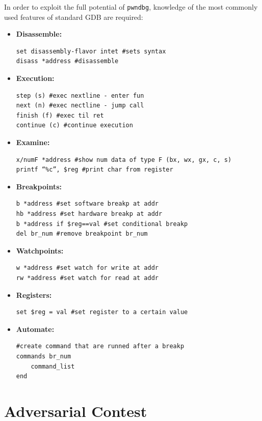 \documentclass{article}
\begin{document}
\pagebreak
In order to exploit the full potential of \texttt{pwndbg}, knowledge of the most commonly used features of standard
GDB are required:
\begin{itemize}
\item{\textbf{Disassemble:}}
\begin{verbatim}
set disassembly-flavor intet #sets syntax
disass *address #disassemble
\end{verbatim}
\item{\textbf{Execution:}}
\begin{verbatim}
step (s) #exec nextline - enter fun
next (n) #exec nectline - jump call
finish (f) #exec til ret
continue (c) #continue execution
\end{verbatim}
\item{\textbf{Examine:}}
\begin{verbatim}
x/numF *address #show num data of type F (bx, wx, gx, c, s)
printf “%c”, $reg #print char from register
\end{verbatim}
\item{\textbf{Breakpoints:}}
\begin{verbatim}
b *address #set software breakp at addr
hb *address #set hardware breakp at addr
b *address if $reg==val #set conditional breakp
del br_num #remove breakpoint br_num
\end{verbatim}
\item{\textbf{Watchpoints:}}
\begin{verbatim}
w *address #set watch for write at addr
rw *address #set watch for read at addr
\end{verbatim}
\item{\textbf{Registers:}}
\begin{verbatim}
set $reg = val #set register to a certain value
\end{verbatim}
\item{\textbf{Automate:}}
\begin{verbatim}
#create command that are runned after a breakp
commands br_num
    command_list
end
\end{verbatim}
\end{itemize}

\section{Adversarial Contest}
\end{document}
